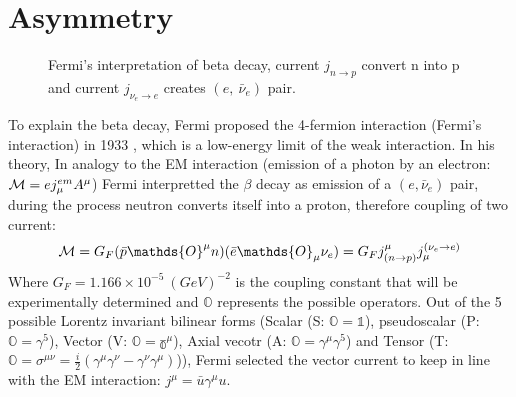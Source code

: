 \section{Asymmetry}
\begin{figure}[h!]
    \centering
    \caption{Fermi's interpretation of beta decay, current $j_{n \rightarrow p}$ 
    convert n into p and current $j_{\nu_e \rightarrow e}$ creates $(e, \ \bar{\nu}_e) $
    pair.}
\end{figure}
To explain the beta decay, Fermi proposed the 4-fermion interaction 
(Fermi's interaction) in 1933 \cite{Fermi1934}, which is a low-energy limit of the 
weak interaction. In his theory, In analogy to the EM interaction (emission of a
photon by an electron: $\mathcal{M} = ej_\mu^{em} A^\mu$) Fermi interpretted the $\beta$
decay as emission of a $(e, \bar{\nu}_e)$ pair, during the process neutron converts
itself into a proton, therefore coupling of two current:
\begin{equation}
    \CM = G_F (\bar{p} \mathds{O}^\mu n)(\bar{e} \mathds{O}_\mu \nu_e) 
	= G_F j^\mu_{(n\rightarrow p)} j_\mu^{(\nu_e\rightarrow e)}
\end{equation}
Where $G_F = 1.166 \times 10^{-5} \ (GeV)^{-2}$ is the coupling constant that 
will be experimentally determined and $\mathds{O}$ represents 
the possible operators. Out of the 5 possible Lorentz invariant bilinear forms 
(Scalar (S: $\mathds{O} = \mathds{1}$), pseudoscalar (P: $\mathds{O} = \gamma^5$), 
Vector (V: $\mathds{O} = \mathds{\gamma^\mu}$), Axial vecotr (A: $\mathds{O} = \gamma^\mu\gamma^5$) 
and Tensor (T: $\mathds{O}=\sigma^{\mu\nu} = \frac{i}{2}(\gamma^\mu\gamma^\nu - \gamma^\nu\gamma^\mu)$)),
Fermi selected the vector current to keep in line with the EM interaction:
$j^\mu = \bar{u} \gamma^\mu u$.

